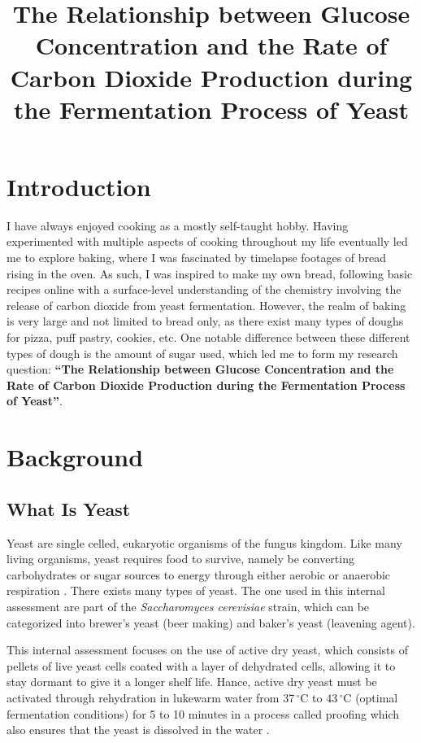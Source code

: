 \documentclass[12pt]{article}
\title{\textbf{The Relationship between Glucose Concentration and the Rate of Carbon Dioxide Production during the Fermentation Process of Yeast}}
\author{}
\date{}
\begin{document}
\maketitle
\newpage
{}

\section{Introduction}
I have always enjoyed cooking as a mostly self-taught hobby. Having experimented with multiple aspects of cooking throughout my life eventually led me to explore baking, where I was fascinated by timelapse footages of bread rising in the oven. As such, I was inspired to make my own bread, following basic recipes online with a surface-level understanding of the chemistry involving the release of carbon dioxide from yeast fermentation. However, the realm of baking is very large and not limited to bread only, as there exist many types of doughs for pizza, puff pastry, cookies, etc. One notable difference between these different types of dough is the amount of sugar used, which led me to form my research question: \textbf{``The Relationship between Glucose Concentration and the Rate of Carbon Dioxide Production during the Fermentation Process of Yeast''}.

\section{Background}

\subsection{What Is Yeast}
Yeast are single celled, eukaryotic organisms of the fungus kingdom. Like many living organisms, yeast requires food to survive, namely be converting carbohydrates or sugar sources to energy through either aerobic or anaerobic respiration \parencite{ref}. There exists many types of yeast. The one used in this internal assessment are part of the \emph{Saccharomyces cerevisiae} strain, which can be categorized into brewer's yeast (beer making) and baker's yeast (leavening agent). \parencite{ref}

This internal assessment focuses on the use of active dry yeast, which consists of pellets of live yeast cells coated with a layer of dehydrated cells, \parencite{ref} allowing it to stay dormant to give it a longer shelf life. Hance, active dry yeast must be activated through rehydration in lukewarm water from 37$\,^{\circ}$C to 43$\,^{\circ}$C (optimal fermentation conditions) for 5 to 10 minutes in a process called proofing which also ensures that the yeast is dissolved in the water \parencite{ref}.
\end{document}
